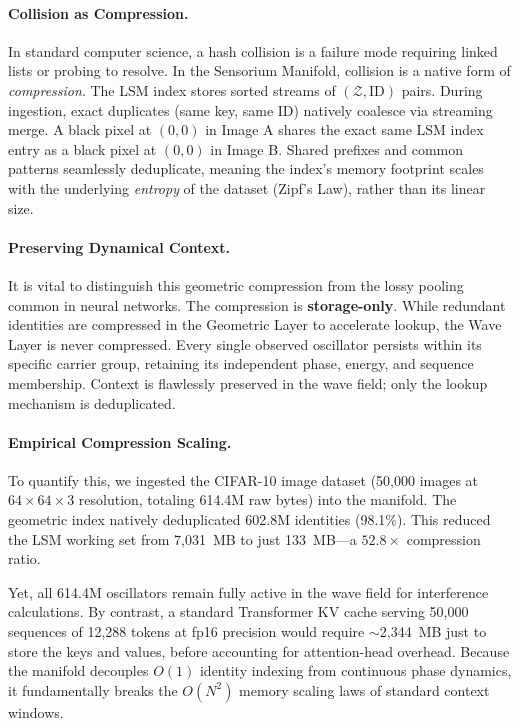 \documentclass[11pt,a4paper]{article}
\begin{document}
\paragraph{Collision as Compression.}
In standard computer science, a hash collision is a failure mode requiring linked lists or probing to resolve. In the Sensorium Manifold, collision is a native form of \emph{compression}. The LSM index stores sorted streams of $(\mathcal{Z}, \text{ID})$ pairs. During ingestion, exact duplicates (same key, same ID) natively coalesce via streaming merge. A black pixel at $(0,0)$ in Image A shares the exact same LSM index entry as a black pixel at $(0,0)$ in Image B. Shared prefixes and common patterns seamlessly deduplicate, meaning the index's memory footprint scales with the underlying \emph{entropy} of the dataset (Zipf's Law), rather than its linear size.

\paragraph{Preserving Dynamical Context.}
It is vital to distinguish this geometric compression from the lossy pooling common in neural networks. The compression is \textbf{storage-only}. While redundant identities are compressed in the Geometric Layer to accelerate lookup, the Wave Layer is never compressed. Every single observed oscillator persists within its specific carrier group, retaining its independent phase, energy, and sequence membership. Context is flawlessly preserved in the wave field; only the lookup mechanism is deduplicated.

\paragraph{Empirical Compression Scaling.}
To quantify this, we ingested the CIFAR-10 image dataset (50,000 images at $64\times64\times3$ resolution, totaling 614.4M raw bytes) into the manifold. The geometric index natively deduplicated 602.8M identities (98.1\%). This reduced the LSM working set from 7,031~MB to just 133~MB—a $\mathbf{52.8\times}$ compression ratio. 

Yet, all 614.4M oscillators remain fully active in the wave field for interference calculations. By contrast, a standard Transformer KV cache serving 50,000 sequences of 12,288 tokens at fp16 precision would require ${\sim}$2,344~MB just to store the keys and values, before accounting for attention-head overhead. Because the manifold decouples $O(1)$ identity indexing from continuous phase dynamics, it fundamentally breaks the $O(N^2)$ memory scaling laws of standard context windows.
\end{document}
